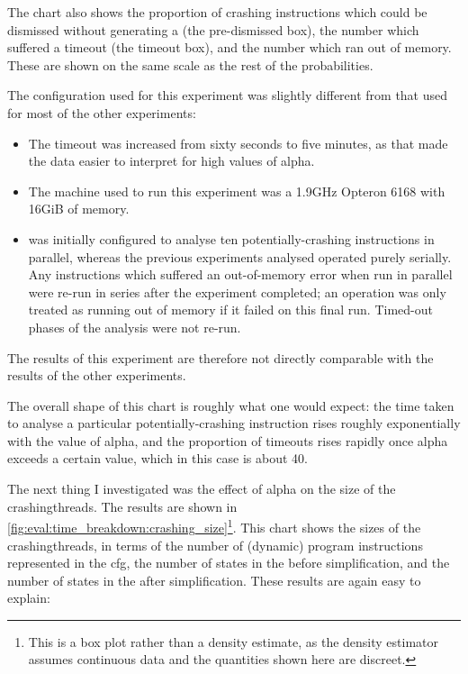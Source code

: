 The chart also shows the proportion of crashing instructions which
could be dismissed without generating a {\StateMachine} (the
pre-dismissed box), the number which suffered a timeout (the timeout
box), and the number which ran out of memory.  These are shown on the
same scale as the rest of the probabilities.

The configuration used for this experiment was slightly different from
that used for most of the other experiments:

\begin{itemize}
\item The timeout was increased from sixty seconds to five minutes, as
  that made the data easier to interpret for high values of
  \gls{alpha}.
\item The machine used to run this experiment was a 1.9GHz Opteron
  6168 with 16GiB of memory.
\item {\Implementation} was initially configured to analyse ten
  potentially-crashing instructions in parallel, whereas the previous
  experiments analysed operated purely serially.  Any instructions
  which suffered an out-of-memory error when run in parallel were
  re-run in series after the experiment completed; an operation was
  only treated as running out of memory if it failed on this final
  run.  Timed-out phases of the analysis were not re-run.
\end{itemize}

The results of this experiment are therefore not directly comparable
with the results of the other experiments.


The overall shape of this chart is roughly what one would expect: the
time taken to analyse a particular potentially-crashing instruction
rises roughly exponentially with the value of \gls{alpha}, and the
proportion of timeouts rises rapidly once \gls{alpha} exceeds a
certain value, which in this case is about 40.

The next thing I investigated was the effect of \gls{alpha} on the
size of the \glspl{crashingthread}.  The results are shown in
\autoref{fig:eval:time_breakdown:crashing_size}\footnote{This is a box
  plot rather than a density estimate, as the density estimator
  assumes continuous data and the quantities shown here are
  discreet.}.  This chart shows the sizes of the
\glspl{crashingthread}, in terms of the number of (dynamic) program
instructions represented in the \gls{cfg}, the number of states in the
{\StateMachine} before simplification, and the number of states in the
{\StateMachine} after simplification.  These results are again easy to
explain:

